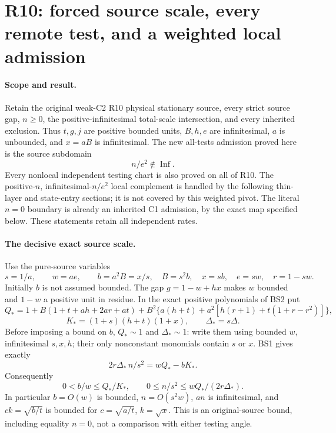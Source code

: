 \section{R10: forced source scale, every remote test, and a weighted local admission}

\paragraph{Scope and result.}
Retain the original weak-C2 R10 physical stationary source, every strict
source gap, $n\ge0$, the positive-infinitesimal total-scale intersection,
and every inherited exclusion. Thus $t,g,j$ are positive bounded units,
$B,h,e$ are infinitesimal, $a$ is unbounded, and $x=aB$ is infinitesimal.
The new all-tests admission proved here is the source subdomain
\[
                         n/e^2\notin\operatorname{Inf}.
\tag{R10.1}
\]
Every nonlocal independent testing chart is also proved on all of R10.
The positive-$n$, infinitesimal-$n/e^2$ local complement is handled by the following thin-layer and state-entry sections; it is not covered by this weighted pivot.
The literal $n=0$ boundary is already an inherited C1 admission, by the
exact map specified below. These statements retain all independent rates.

\paragraph{The decisive exact source scale.}
Use the pure-source variables
\[
 s=1/a,\qquad w=ae,\qquad b=a^2B=x/s,
 \quad B=s^2b,\quad x=sb,\quad e=sw,\quad r=1-sw.
\]
Initially $b$ is not assumed bounded. The gap $g=1-w+hx$ makes $w$
bounded and $1-w$ a positive unit in residue. In the exact positive
polynomials of BS2 put
\[
 Q_*=1+B(1+t+ah+2ar+at)
 +B^2\{a(h+t)+a^2[h(r+1)+t(1+r-r^2)]\},
\]
\[
 K_*=(1+s)(h+t)(1+x),\qquad \Delta_*=s\Delta.
\]
Before imposing a bound on $b$, $Q_*\sim1$ and $\Delta_*\sim1$:
write them using bounded $w$, infinitesimal $s,x,h$; their only
nonconstant monomials contain $s$ or $x$. BS1 gives exactly
\[
 \boxed{\quad 2r\Delta_*\,n/s^2=wQ_*-bK_* .\quad}
\tag{R10.2}
\]
Consequently
\[
 0<b/w\le Q_*/K_*,\qquad
 0\le n/s^2\le wQ_*/(2r\Delta_*).
\tag{R10.3}
\]
In particular $b=O(w)$ is bounded, $n=O(s^2w)$, $an$ is
infinitesimal, and $ck=\sqrt{b/t}$ is bounded for
$c=\sqrt{a/t}$, $k=\sqrt{x}$. This is an original-source bound,
including equality $n=0$, not a comparison with either testing angle.

